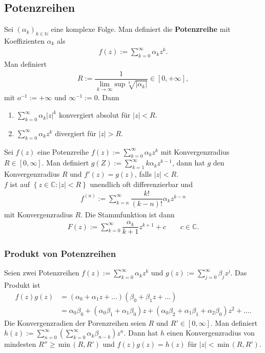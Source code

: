 \documentclass[a4paper,12pt]{article}
\numberwithin{equation}{section}
\begin{document}
\subsection{Potenzreihen}
Sei $\left(\alpha _k\right)_{k \in \mathbb{N}}$ eine komplexe Folge. Man definiert die \textbf{Potenzreihe} mit Koeffizienten $\alpha _k$ als
\begin{align} 
        f\left(z\right):=\sum_{k=0}^{\infty}\alpha _kz^k
.\end{align} 
Man definiert 
\begin{align} 
        R:=\dfrac{1}{\lim_{k\rightarrow \infty}\text{sup}\,\sqrt[k]{|\alpha _k|}} \in [0,+\infty]
,\end{align} 
mit $o^{-1}:=+\infty$ und $\infty^{-1}:=0$. Dann
\begin{enumerate}[label=\roman*)]
        \item $\sum_{k=0}^{\infty}\alpha _k|z|^k$ konvergiert absolut für $|z|<R$.
        \item $\sum_{k=0}^{\infty}\alpha _kz^k$ divergiert für $|z|>R$.
\end{enumerate}
Sei $f\left(z\right)$ eine Potenzreihe $f\left(z\right):=\sum_{k=0}^{\infty}\alpha _kz^k$ mit Konvergenzradius $R \in \left[0,\infty\right]$. Man definiert $g\left(Z\right):=\sum_{k=1}^{\infty}k\alpha _kz^{k-1}$, dann hat $g$ den Konvergenzradius $R$ und $f'\left(z\right)=g\left(z\right)$, falls $|z|<R$.\\\indent
$f$ ist auf $\left\{z \in \mathbb{C}:|z|<R\right\}$ unendlich oft differenzierbar und
\begin{align} 
        f^{\left(n\right)}:=\sum_{k=n}^{\infty}\dfrac{k!}{\left(k-n\right)!}\alpha _kz^{k-n}
\end{align} 
mit Konvergenzradius $R$. Die Stammfunktion ist dann
\begin{align} 
        F\left(z\right):=\sum_{k=0}^{\infty}\dfrac{\alpha _k}{k+1}z^{k+1}+c\qquad c  \in \mathbb{C}
.\end{align} 

\subsubsection{Produkt von Potenzreihen}
Seien zwei Potenzreihen $f\left(z\right):=\sum_{k=0}^{\infty}\alpha _kz^k$ und $g\left(z\right):=\sum_{j=0}^{\infty}\beta _jz^j$. Das Produkt ist
\begin{align} 
        f\left(z\right)g\left(z\right)&=\left(\alpha _0+\alpha _1z+\hdots \right)\left(\beta _0+\beta _1z+\hdots \right)\\
                                      &=\alpha _0\beta _0+\left(\alpha _0\beta _1+\alpha _1\beta _0\right)z+\left(\alpha _0\beta _2+\alpha _1\beta _1+\alpha _2\beta _0\right)z^2+\hdots 
.\end{align} 
Die Konvergenzradien der Porenzreihen seien $R$ und $R' \in \left[0,\infty\right]$. Man definiert $h\left(z\right):=\sum_{n=0}^{\infty}\left(\sum_{k=0}^{\infty}\alpha _k\beta _{n-k}\right)z^n$. Dann hat $h$ einen Konvergenzradius von mindesten $R''\geq \,\text{min}\,\left(R,R'\right)$ und $f\left(z\right)g\left(z\right)=h\left(z\right)$ für $|z|<\,\text{min}\,\left(R,R'\right)$.

\end{document}
